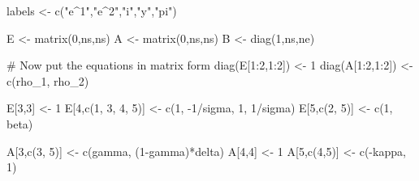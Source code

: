 \documentclass[
  letterpaper,
]{book}
\newenvironment{Shaded}{\begin{snugshade}}{\end{snugshade}}
\newcommand{\CommentTok}[1]{\textcolor[rgb]{0.37,0.37,0.37}{#1}}
\newcommand{\DecValTok}[1]{\textcolor[rgb]{0.68,0.00,0.00}{#1}}
\newcommand{\FunctionTok}[1]{\textcolor[rgb]{0.28,0.35,0.67}{#1}}
\newcommand{\NormalTok}[1]{\textcolor[rgb]{0.00,0.23,0.31}{#1}}
\newcommand{\OtherTok}[1]{\textcolor[rgb]{0.00,0.23,0.31}{#1}}
\newcommand{\SpecialCharTok}[1]{\textcolor[rgb]{0.37,0.37,0.37}{#1}}
\newcommand{\StringTok}[1]{\textcolor[rgb]{0.13,0.47,0.30}{#1}}
\begin{document}
\begin{Shaded}
\begin{Highlighting}[]
\NormalTok{labels }\OtherTok{\textless{}{-}} \FunctionTok{c}\NormalTok{(}\StringTok{"e\^{}1"}\NormalTok{,}\StringTok{"e\^{}2"}\NormalTok{,}\StringTok{"i"}\NormalTok{,}\StringTok{"y"}\NormalTok{,}\StringTok{"pi"}\NormalTok{)}

\NormalTok{E }\OtherTok{\textless{}{-}} \FunctionTok{matrix}\NormalTok{(}\DecValTok{0}\NormalTok{,ns,ns)}
\NormalTok{A }\OtherTok{\textless{}{-}} \FunctionTok{matrix}\NormalTok{(}\DecValTok{0}\NormalTok{,ns,ns)}
\NormalTok{B }\OtherTok{\textless{}{-}} \FunctionTok{diag}\NormalTok{(}\DecValTok{1}\NormalTok{,ns,ne)}

\CommentTok{\# Now put the equations in matrix form}
\FunctionTok{diag}\NormalTok{(E[}\DecValTok{1}\SpecialCharTok{:}\DecValTok{2}\NormalTok{,}\DecValTok{1}\SpecialCharTok{:}\DecValTok{2}\NormalTok{]) }\OtherTok{\textless{}{-}} \DecValTok{1}
\FunctionTok{diag}\NormalTok{(A[}\DecValTok{1}\SpecialCharTok{:}\DecValTok{2}\NormalTok{,}\DecValTok{1}\SpecialCharTok{:}\DecValTok{2}\NormalTok{]) }\OtherTok{\textless{}{-}} \FunctionTok{c}\NormalTok{(rho\_1, rho\_2)}

\NormalTok{E[}\DecValTok{3}\NormalTok{,}\DecValTok{3}\NormalTok{]             }\OtherTok{\textless{}{-}} \DecValTok{1} 
\NormalTok{E[}\DecValTok{4}\NormalTok{,}\FunctionTok{c}\NormalTok{(}\DecValTok{1}\NormalTok{, }\DecValTok{3}\NormalTok{, }\DecValTok{4}\NormalTok{, }\DecValTok{5}\NormalTok{)] }\OtherTok{\textless{}{-}} \FunctionTok{c}\NormalTok{(}\DecValTok{1}\NormalTok{, }\SpecialCharTok{{-}}\DecValTok{1}\SpecialCharTok{/}\NormalTok{sigma, }\DecValTok{1}\NormalTok{, }\DecValTok{1}\SpecialCharTok{/}\NormalTok{sigma)}
\NormalTok{E[}\DecValTok{5}\NormalTok{,}\FunctionTok{c}\NormalTok{(}\DecValTok{2}\NormalTok{, }\DecValTok{5}\NormalTok{)]       }\OtherTok{\textless{}{-}} \FunctionTok{c}\NormalTok{(}\DecValTok{1}\NormalTok{, beta)}

\NormalTok{A[}\DecValTok{3}\NormalTok{,}\FunctionTok{c}\NormalTok{(}\DecValTok{3}\NormalTok{, }\DecValTok{5}\NormalTok{)]       }\OtherTok{\textless{}{-}} \FunctionTok{c}\NormalTok{(gamma, (}\DecValTok{1}\SpecialCharTok{{-}}\NormalTok{gamma)}\SpecialCharTok{*}\NormalTok{delta)}
\NormalTok{A[}\DecValTok{4}\NormalTok{,}\DecValTok{4}\NormalTok{]             }\OtherTok{\textless{}{-}} \DecValTok{1}
\NormalTok{A[}\DecValTok{5}\NormalTok{,}\FunctionTok{c}\NormalTok{(}\DecValTok{4}\NormalTok{,}\DecValTok{5}\NormalTok{)]        }\OtherTok{\textless{}{-}} \FunctionTok{c}\NormalTok{(}\SpecialCharTok{{-}}\NormalTok{kappa, }\DecValTok{1}\NormalTok{)}
\end{Highlighting}
\end{Shaded}
\end{document}

